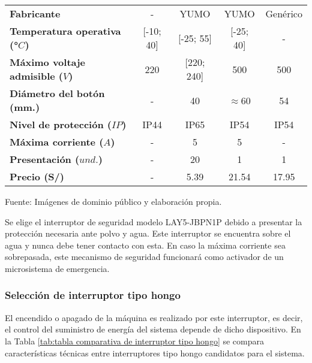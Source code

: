 \begin{mytable}[H]
\begin{tabular}{l|c|c|c|c|}
\begin{minipage}{\mythirdmaxsizeofcontenttable}
		\end{minipage}  \\ \hline
		\multicolumn{1}{|l|}{\textbf{Fabricante}} & - & YUMO & YUMO & Genérico \\ \hline
		\multicolumn{1}{|l|}{\textbf{Temperatura operativa (°$C$)}} & [-10; 40] & [-25; 55] & [-25; 40] & - \\ \hline
		\multicolumn{1}{|l|}{
			\begin{minipage}{\myforthmaxsizeofcontenttable}			
				\textbf{Máximo voltaje admisible ($V$)}
			\end{minipage}
		} & 220 & [220; 240] & 500 & 500 \\ \hline
		\multicolumn{1}{|l|}{
			\begin{minipage}{\myforthmaxsizeofcontenttable}			
				\textbf{Diámetro del botón (mm.)}
			\end{minipage}
		} & - & 40 & $\approx$60 & 54 \\ \hline
		\multicolumn{1}{|l|}{\textbf{Nivel de protección ($IP$)}} & IP44 & IP65 & IP54 & IP54 \\ \hline
		\multicolumn{1}{|l|}{\textbf{Máxima corriente ($A$)}} & - & 5 & 5 & - \\ \hline
		\multicolumn{1}{|l|}{\textbf{Presentación ($und.$)}} & - & 20 & 1 & 1 \\ \hline
		\multicolumn{1}{|l|}{\textbf{Precio (S/)}} & - & 5.39 & 21.54 & 17.95 \\ \hline
	\end{tabular}
	\begin{myflushcenteraftertable}	
		Fuente: Imágenes de dominio público y elaboración propia.
	\end{myflushcenteraftertable}
\end{mytable}

Se elige el interruptor de seguridad modelo LAY5-JBPN1P debido a presentar la protección necesaria ante polvo y agua. Este interruptor se encuentra sobre el agua y nunca debe tener contacto con esta. En caso la máxima corriente sea sobrepasada, este mecanismo de seguridad funcionará como activador de un microsistema de  emergencia.


\subsubsection{Selección de interruptor tipo hongo}

El encendido o apagado de la máquina es realizado por este interruptor, es decir, el control del suministro de energía del sistema depende de dicho dispositivo. En la Tabla \ref{tab:tabla comparativa de interruptor tipo hongo} se compara características técnicas entre interruptores tipo hongo candidatos para el sistema.

